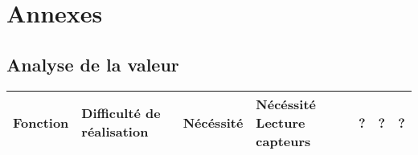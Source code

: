 \vfil
\pagebreak
\section{Annexes}

\subsection{Analyse de la valeur}

\begin{center}
\begin{longtable}{|m{6cm}|m{17mm}|m{17mm}|m{17mm}|}
\hline
Fonction & Difficulté de réalisation & Nécéssité & Nécéssité\endhead
\hline
Lecture capteurs
& %
?
& %
?
& %
?
\\\hline
\end{longtable}
\end{center}
